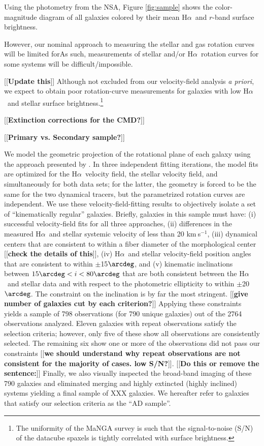 \documentclass[apj,iop,revtex4,numberedappendix]{emulateapj}
\newcommand{\comment}[2][todo]{{\color{#1}[[{\bf #2}]]}}
\newcommand{\kms}{{km$~\!$s$^{-1}$}}
\newcommand{\halpha}{H$\alpha$}
\begin{document}
Using the photometry from the NSA, Figure \ref{fig:sample} shows the
color-magnitude diagram of all galaxies colored by their mean \halpha\
and $r$-band surface brightness.

However, our nominal approach to measuring the stellar and gas rotation curves will be limited forAs such,
measurements of stellar and/or \halpha\ rotation curves for some systems
will be difficult/impossible.  



\comment{Update this} Although not
excluded from our velocity-field analysis {\em a priori}, we expect to
obtain poor rotation-curve measurements for galaxies with low \halpha\
and stellar surface brightness.\footnote{
%
The uniformity of the MaNGA survey \citet{2015AJ....150...19L} is such
that the signal-to-noise (S/N) of the datacube spaxels is tightly
correlated with surface brightness.}

\comment{Extinction corrections for the CMD?}

\comment{Primary vs. Secondary sample?}

We model the geometric projection of the rotational plane of each galaxy
using the approach presented by \citep[][see also
\citealt{2011ApJ...742...18W}]{2003ApJ...599L..79A}.  In three
independent fitting iterations, the model fits are optimized for the
\halpha\ velocity field, the stellar velocity field, and simultaneously
for both data sets; for the latter, the geometry is forced to be the
same for the two dynamical tracers, but the parametrized rotation curves
are independent.  We use these velocity-field-fitting results to
objectively isolate a set of ``kinematically regular'' galaxies.
Briefly, galaxies in this sample must have: (i) successful
velocity-field fits for all three approaches, (ii) differences in the
measured \halpha\ and stellar systemic velocity of less than 20 \kms,
(iii) dynamical centers that are consistent to within a fiber diameter
of the morphological center \comment{check the details of this}, (iv)
\halpha\ and stellar velocity-field position angles that are consistent
to within $\pm$15$\arcdeg$, and (v) kinematic inclinations between
$15\arcdeg < i < 80\arcdeg$ that are both consistent between the
\halpha\ and stellar data and with respect to the photometric
ellipticity to within $\pm$20$\arcdeg$.  The constraint on the
inclination is by far the most stringent. \comment{give number of
galaxies cut by each criterion?}  Applying these constraints yields a
sample of 798 observations (for 790 unique galaxies) out of the 2764
observations analyzed.  Eleven galaxies with repeat observations satisfy
the selection criteria; however, only five of these show all
observations are consistently selected.  The remaining six show one or
more of the observations did not pass our constraints \comment{we should
understand why repeat observations are not consistent for the majority
of cases.  low S/N?}.  \comment{Do this or remove the sentence:}
Finally, we also visually inspected the broad-band imaging of these 790
galaxies and eliminated merging and highly extincted (highly inclined)
systems yielding a final sample of XXX galaxies.  We hereafter refer to
galaxies that satisfy our selection criteria as the ``AD sample''.
\end{document}
